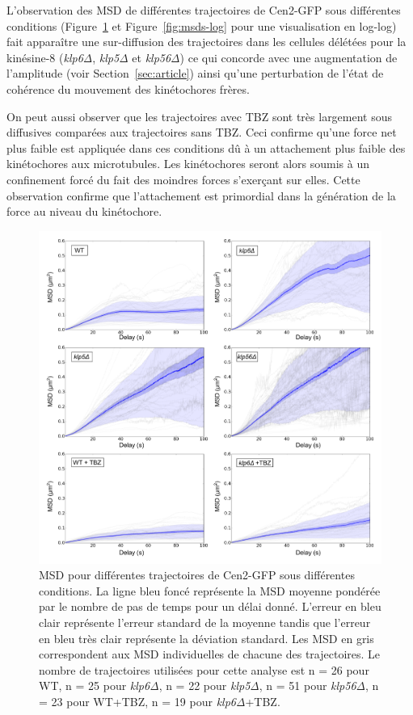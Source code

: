 \documentclass[12pt,a4paper,twoside,openright]{book}
\begin{document}
L'observation des MSD de différentes trajectoires de Cen2-GFP sous
différentes conditions (Figure~\ref{fig:msds} et
Figure~\ref{fig:msds-log} pour une visualisation en log-log) fait
apparaître une sur-diffusion des trajectoires dans les cellules délétées
pour la kinésine-8 (\emph{klp6Δ}, \emph{klp5Δ} et \emph{klp56Δ}) ce qui
concorde avec une augmentation de l'amplitude (voir
Section~\ref{sec:article}) ainsi qu'une perturbation de l'état de
cohérence du mouvement des kinétochores frères.

On peut aussi observer que les trajectoires avec TBZ sont très largement
sous diffusives comparées aux trajectoires sans TBZ. Ceci confirme
qu'une force net plus faible est appliquée dans ces conditions dû à un
attachement plus faible des kinétochores aux microtubules. Les
kinétochores seront alors soumis à un confinement forcé du fait des
moindres forces s'exerçant sur elles. Cette observation confirme que
l'attachement est primordial dans la génération de la force au niveau du
kinétochore.

\begin{figure}[htbp]
\centering
\includegraphics{figures/results/imaging/msds.png}
\caption[MSD pour différentes trajectoires de Cen2-GFP sous différentes conditions.]{\label{fig:msds}MSD
pour différentes trajectoires de Cen2-GFP sous différentes conditions.
La ligne bleu foncé représente la MSD moyenne pondérée par le nombre de
pas de temps pour un délai donné. L'erreur en bleu clair représente
l'erreur standard de la moyenne tandis que l'erreur en bleu très clair
représente la déviation standard. Les MSD en gris correspondent aux MSD
individuelles de chacune des trajectoires. Le nombre de trajectoires
utilisées pour cette analyse est n = 26 pour WT, n = 25 pour
\emph{klp6Δ}, n = 22 pour \emph{klp5Δ}, n = 51 pour \emph{klp56Δ}, n =
23 pour WT+TBZ, n = 19 pour \emph{klp6Δ}+TBZ.}
\end{figure}
\end{document}
